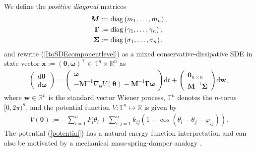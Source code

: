 \documentclass[10pt,twocolumn]{IEEEtran}
\begin{document}
We define the \emph{positive diagonal} matrices
\begin{align*}
\bm{M} &:= {\rm{diag}}\left(m_{1},\hdots,m_{n}\right), \nonumber\\
\bm{\Gamma} &:= {\rm{diag}}\left(\gamma_{1},\hdots,\gamma_{n}\right),\nonumber\\
\bm{\Sigma} &:= {\rm{diag}}\left(\sigma_{1},\hdots,\sigma_{n}\right),
\end{align*}
and rewrite (\ref{ItoSDEcomponentlevel}) as a mixed conservative-dissipative SDE in state vector $\bm{x} := (\bm{\theta},\bm{\omega})^{\top} \in \mathbb{T}^{n} \times \mathbb{R}^{n}$ as
\begin{align}
\begin{pmatrix}
{\mathrm{d}}\bm{\theta}\\
{\mathrm{d}}\bm{\omega}	
\end{pmatrix}
\! = \!\begin{pmatrix}
\bm{\omega}\\
-\bm{M}^{-1}\nabla_{\bm{\theta}}V(\bm{\theta}) -\bm{M}^{-1}\bm{\Gamma}\bm{\omega}  	
\end{pmatrix}{\mathrm{d}}t + \!\begin{pmatrix}
 \bm{0}_{n\times n}\\
 \bm{M}^{-1}\bm{\Sigma}	
 \end{pmatrix}{\mathrm{d}}\bm{w},
\label{ItoSDEvectorlevel}
\end{align}
where 
$\bm{w}\in\mathbb{R}^{n}$ is the standard vector Wiener process, $\mathbb{T}^{n}$ denotes the $n$-torus $[0,2\pi)^{n}$, and the potential function $V : \mathbb{T}^{n} \mapsto \mathbb{R}$ is given by
\begin{align}
V(\bm{\theta}) := -\displaystyle\sum_{i=1}^{n} P_{i}\theta_{i} + \!\displaystyle\sum_{i,j=1}^{n}\!k_{ij}\left(1 - \cos(\theta_{i}-\theta_{j}-\varphi_{ij})\right).
\label{potential}	
\end{align}
The potential (\ref{potential}) has a natural energy function interpretation and can also be motivated by a mechanical mass-spring-damper analogy \cite{dorfler2013synchronization,ishizaki2018}. %
\end{document}
